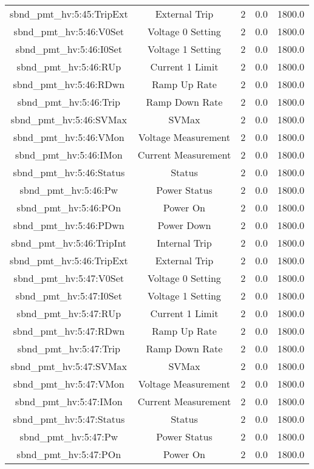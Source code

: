 \begin{table}[ptb]
\begin{tabular}{c | c c c c}
sbnd_pmt_hv:5:45:TripExt & External Trip & 2 & 0.0 & 1800.0\\ 
sbnd_pmt_hv:5:46:V0Set & Voltage 0 Setting & 2 & 0.0 & 1800.0\\ 
sbnd_pmt_hv:5:46:I0Set & Voltage 1 Setting & 2 & 0.0 & 1800.0\\ 
sbnd_pmt_hv:5:46:RUp & Current 1 Limit & 2 & 0.0 & 1800.0\\ 
sbnd_pmt_hv:5:46:RDwn & Ramp Up Rate & 2 & 0.0 & 1800.0\\ 
sbnd_pmt_hv:5:46:Trip & Ramp Down Rate & 2 & 0.0 & 1800.0\\ 
sbnd_pmt_hv:5:46:SVMax & SVMax & 2 & 0.0 & 1800.0\\ 
sbnd_pmt_hv:5:46:VMon & Voltage Measurement & 2 & 0.0 & 1800.0\\ 
sbnd_pmt_hv:5:46:IMon & Current Measurement & 2 & 0.0 & 1800.0\\ 
sbnd_pmt_hv:5:46:Status & Status & 2 & 0.0 & 1800.0\\ 
sbnd_pmt_hv:5:46:Pw & Power Status & 2 & 0.0 & 1800.0\\ 
sbnd_pmt_hv:5:46:POn & Power On & 2 & 0.0 & 1800.0\\ 
sbnd_pmt_hv:5:46:PDwn & Power Down & 2 & 0.0 & 1800.0\\ 
sbnd_pmt_hv:5:46:TripInt & Internal Trip & 2 & 0.0 & 1800.0\\ 
sbnd_pmt_hv:5:46:TripExt & External Trip & 2 & 0.0 & 1800.0\\ 
sbnd_pmt_hv:5:47:V0Set & Voltage 0 Setting & 2 & 0.0 & 1800.0\\ 
sbnd_pmt_hv:5:47:I0Set & Voltage 1 Setting & 2 & 0.0 & 1800.0\\ 
sbnd_pmt_hv:5:47:RUp & Current 1 Limit & 2 & 0.0 & 1800.0\\ 
sbnd_pmt_hv:5:47:RDwn & Ramp Up Rate & 2 & 0.0 & 1800.0\\ 
sbnd_pmt_hv:5:47:Trip & Ramp Down Rate & 2 & 0.0 & 1800.0\\ 
sbnd_pmt_hv:5:47:SVMax & SVMax & 2 & 0.0 & 1800.0\\ 
sbnd_pmt_hv:5:47:VMon & Voltage Measurement & 2 & 0.0 & 1800.0\\ 
sbnd_pmt_hv:5:47:IMon & Current Measurement & 2 & 0.0 & 1800.0\\ 
sbnd_pmt_hv:5:47:Status & Status & 2 & 0.0 & 1800.0\\ 
sbnd_pmt_hv:5:47:Pw & Power Status & 2 & 0.0 & 1800.0\\ 
sbnd_pmt_hv:5:47:POn & Power On & 2 & 0.0 & 1800.0\\ 

\end{tabular}
\end{table}
